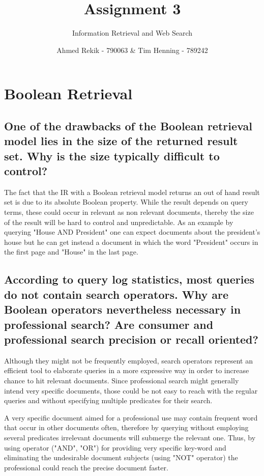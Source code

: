 \documentclass{scrartcl}
\title{Assignment 3}
\subtitle{Information Retrieval and Web Search}
\author{Ahmed Rekik - 790063 \& Tim Henning - 789242}
\begin{document}
\maketitle

\setcounter{section}{1}
\section{Boolean Retrieval}

\subsection{One of the drawbacks of the Boolean retrieval model lies in the size of the returned result
set. Why is the size typically difficult to control? }

The fact that the IR with a Boolean retrieval model returns an out of hand result set is due to its absolute Boolean property. While the result depends on query terms, these could occur in relevant as non relevant documents, thereby the size of the result will be hard to control and unpredictable. As an example by querying "House AND President" one can expect documents about the president's house but he can get instead a document in which the word "President" occurs in the first page and "House" in the last page.


\subsection{According to query log statistics, most queries do not contain search operators. Why are
Boolean operators nevertheless necessary in professional search? Are consumer and professional
search precision or recall oriented? }

Although they might not be frequently employed, search operators represent an efficient tool to elaborate queries in a more expressive way in order to increase chance to hit relevant documents. Since professional search might generally intend very specific documents, those could be not easy to reach with the regular queries and without specifying multiple predicates for their search.

A very specific document aimed for a professional use may contain frequent word that occur in other documents often, therefore by querying without employing several predicates irrelevant documents will submerge the relevant one. Thus, by using operator ("AND", "OR") for providing very specific key-word and eliminating the undesirable document subjects (using "NOT" operator) the professional could reach the precise document faster.
\end{document}
